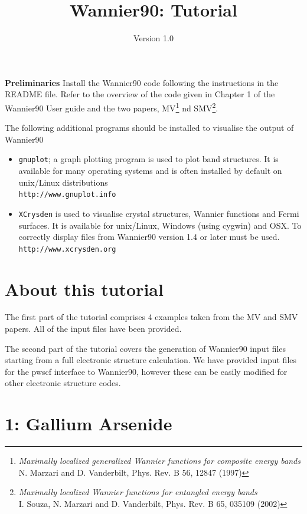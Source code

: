 \documentclass[a4paper,11pt,twoside]{article}
\title{Wannier90: Tutorial}
\author{Version 1.0}
\begin{document}
\maketitle

{\bf Preliminaries}
Install the Wannier90 code following the instructions in the README file.
Refer to the overview of the code given in Chapter 1 of the Wannier90 User guide
and the two papers, MV\footnote{{\it Maximally localized generalized
    Wannier functions for composite energy bands}\\ N. Marzari and
  D. Vanderbilt, Phys. Rev. B 56, 12847 (1997)} 
nd SMV\footnote{{\it Maximally localized Wannier functions for entangled energy bands}\\
I. Souza, N. Marzari and D. Vanderbilt, Phys. Rev. B 65, 035109 (2002)}.


The following additional programs should be installed to visualise the output of Wannier90
\begin{itemize}
\item {\tt gnuplot}; a graph plotting program is used to plot band structures. It is 
available for many operating systems and is often installed by default on
 unix/Linux distributions\\
{\tt http://www.gnuplot.info}
\item {\tt XCrysden} is used to visualise crystal structures, Wannier functions and Fermi
surfaces. It is available for unix/Linux, Windows (using cygwin) and OSX. To correctly display
files from Wannier90 version 1.4 or later must be used.\\
{\tt http://www.xcrysden.org}
\end{itemize}



\section*{About this tutorial}

The first part of the tutorial comprises 4 examples taken from the MV and SMV papers.
All of the input files have been provided.

The second part of the tutorial covers the generation of Wannier90 input files
starting from a full electronic structure calculation. We have provided input files for the pwscf
interface to Wannier90, however these can be easily modified for other electronic structure
codes.

\cleardoublepage

\section*{1: Gallium Arsenide}
\end{document}

